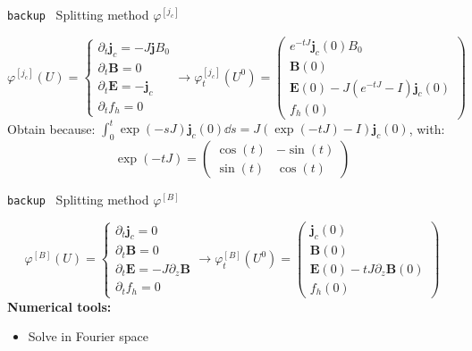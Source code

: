 \documentclass{beamer}
\newcommand{\mbold}[1]{{\textbf{\color{PLB}#1}}}
\newcommand{\Mvb}[1]{\boldsymbol{#1}}
\newenvironment{bframe}[1]%
{%
  \begin{frame}{{\small\texttt{backup}\ } #1}
}%
{%
  \end{frame}
}
\begin{document}
\begin{bframe}{Splitting method $\varphi^{[j_c]}$}
  $$
    \varphi^{[j_c]}(U) =
    \begin{cases}
      \partial_t \Mvb{j}_c = -J\Mvb{j}B_0 \\
      \partial_t \Mvb{B} = 0 \\
      \partial_t \Mvb{E} = -\Mvb{j}_c \\
      \partial_t f_h = 0
    \end{cases}
    \rightarrow
    \varphi_{t}^{[j_c]}(U^0) = \begin{pmatrix}
      e^{-tJ}\Mvb{j}_c(0)B_0 \\
      \Mvb{B}(0) \\
      \Mvb{E}(0) - J(e^{-tJ}-I)\Mvb{j}_c(0) \\
      f_h(0)
    \end{pmatrix}
  $$
  Obtain because: $\int_0^t \exp(-sJ)\Mvb{j}_c(0)\dd{s} = J(\exp(-tJ)-I)\Mvb{j}_c(0)$, with:
  $$
    \exp(-tJ) = \begin{pmatrix}\cos(t) & -\sin(t) \\ \sin(t) & \cos(t) \end{pmatrix}
  $$
\end{bframe}
\begin{bframe}{Splitting method $\varphi^{[B]}$}
  $$
    \varphi^{[B]}(U) =
    \begin{cases}
      \partial_t \Mvb{j}_c = 0 \\
      \partial_t \Mvb{B} = 0 \\
      \partial_t \Mvb{E} = -J\partial_z\Mvb{B} \\
      \partial_t f_h = 0
    \end{cases}
    \rightarrow
    \varphi_{t}^{[B]}(U^0) = \begin{pmatrix}
      \Mvb{j}_c(0) \\
      \Mvb{B}(0) \\
      \Mvb{E}(0) - tJ\partial_z\Mvb{B}(0) \\
      f_h(0)
    \end{pmatrix}
  $$
  \mbold{Numerical tools:}
  \begin{itemize}
    \item Solve in Fourier space
  \end{itemize}
\end{bframe}
\end{document}
